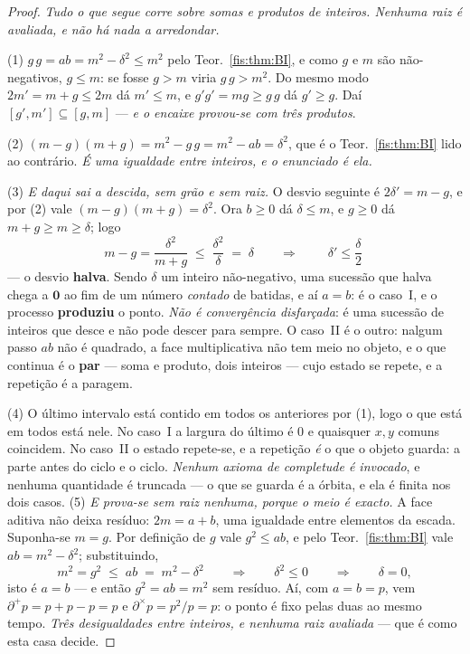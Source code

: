 \documentclass[livro.tex]{subfiles}
\begin{document}
\begin{proof}
\emph{Tudo o que segue corre sobre somas e produtos de inteiros. Nenhuma raiz é
avaliada, e não há nada a arredondar.}

(1) $g\,g=ab=m^{2}-\delta^{2}\le m^{2}$ pelo Teor.~\ref{fis:thm:BI}, e como $g$ e
$m$ são não-negativos, $g\le m$: se fosse $g>m$ viria $g\,g>m^{2}$. Do mesmo
modo $2m'=m+g\le 2m$ dá $m'\le m$, e $g'g'=mg\ge g\,g$ dá $g'\ge g$. Daí
$[g',m']\subseteq[g,m]$ --- \emph{e o encaixe provou-se com três produtos}.

(2) $(m-g)(m+g)=m^{2}-g\,g=m^{2}-ab=\delta^{2}$, que é o
Teor.~\ref{fis:thm:BI} lido ao contrário. \emph{É uma igualdade entre inteiros, e
o enunciado é ela.}

(3) \emph{E daqui sai a descida, sem grão e sem raiz.} O desvio seguinte é
$2\delta'=m-g$, e por (2) vale $(m-g)(m+g)=\delta^{2}$. Ora $b\ge0$ dá
$\delta\le m$, e $g\ge0$ dá $m+g\ge m\ge\delta$; logo
\[
m-g=\frac{\delta^{2}}{m+g}\;\le\;\frac{\delta^{2}}{\delta}\;=\;\delta
\qquad\Longrightarrow\qquad
\boxed{\;\delta'\le\frac{\delta}{2}\;}
\]
--- o desvio \textbf{halva}. Sendo $\delta$ um inteiro não-negativo, uma sucessão
que halva chega a $\mathbf{0}$ ao fim de um número \emph{contado} de batidas, e aí
$a=b$: é o caso~I, e o processo \textbf{produziu} o ponto. \emph{Não é
convergência disfarçada}: é uma sucessão de inteiros que desce e não pode descer
para sempre. O caso~II é o outro: nalgum passo $ab$ não é quadrado, a face
multiplicativa não tem meio no objeto, e o que continua é o \textbf{par} --- soma
e produto, dois inteiros --- cujo estado se repete, e a repetição é a paragem.

(4) O último intervalo está contido em todos os anteriores por (1), logo o que
está em todos está nele. No caso~I a largura do último é $0$ e quaisquer $x,y$
comuns coincidem. No caso~II o estado repete-se, e a repetição \emph{é} o que o
objeto guarda: a parte antes do ciclo e o ciclo. \emph{Nenhum axioma de completude
é invocado}, e nenhuma quantidade é truncada --- o que se guarda é a órbita, e ela
é finita nos dois casos.
(5) \emph{E prova-se sem raiz nenhuma, porque o meio é exacto.} A face aditiva
não deixa resíduo: $2m=a+b$, uma igualdade entre elementos da escada. Suponha-se
$m=g$. Por definição de $g$ vale $g^{2}\le ab$, e pelo Teor.~\ref{fis:thm:BI}
vale $ab=m^{2}-\delta^{2}$; substituindo,
\[
m^{2}=g^{2}\;\le\;ab\;=\;m^{2}-\delta^{2}
\qquad\Longrightarrow\qquad \delta^{2}\le0
\qquad\Longrightarrow\qquad \delta=0 ,
\]
isto é $a=b$ --- e então $g^{2}=ab=m^{2}$ sem resíduo. Aí, com $a=b=p$, vem
$\partial^{+}p=p+p-p=p$ e $\partial^{\times}p=p^{2}/p=p$: o ponto é fixo pelas
duas ao mesmo tempo. \emph{Três desigualdades entre inteiros, e nenhuma raiz
avaliada} --- que é como esta casa decide.\end{proof}
\end{document}
